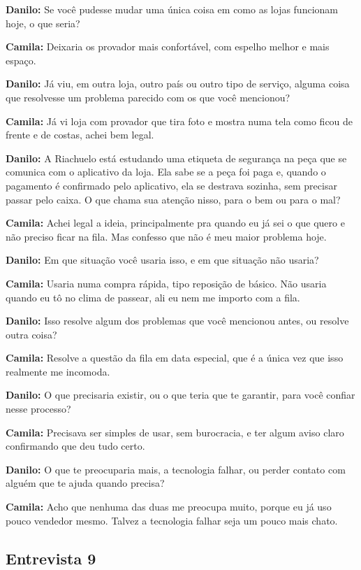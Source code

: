 \textbf{Danilo:} Se você pudesse mudar uma única coisa em como as lojas funcionam hoje, o que seria?

\textbf{Camila:} Deixaria os provador mais confortável, com espelho melhor e mais espaço.

\textbf{Danilo:} Já viu, em outra loja, outro país ou outro tipo de serviço, alguma coisa que resolvesse um problema parecido com os que você mencionou?

\textbf{Camila:} Já vi loja com provador que tira foto e mostra numa tela como ficou de frente e de costas, achei bem legal.

\textbf{Danilo:} A Riachuelo está estudando uma etiqueta de segurança na peça que se comunica com o aplicativo da loja. Ela sabe se a peça foi paga e, quando o pagamento é confirmado pelo aplicativo, ela se destrava sozinha, sem precisar passar pelo caixa. O que chama sua atenção nisso, para o bem ou para o mal?

\textbf{Camila:} Achei legal a ideia, principalmente pra quando eu já sei o que quero e não preciso ficar na fila. Mas confesso que não é meu maior problema hoje.

\textbf{Danilo:} Em que situação você usaria isso, e em que situação não usaria?

\textbf{Camila:} Usaria numa compra rápida, tipo reposição de básico. Não usaria quando eu tô no clima de passear, ali eu nem me importo com a fila.

\textbf{Danilo:} Isso resolve algum dos problemas que você mencionou antes, ou resolve outra coisa?

\textbf{Camila:} Resolve a questão da fila em data especial, que é a única vez que isso realmente me incomoda.

\textbf{Danilo:} O que precisaria existir, ou o que teria que te garantir, para você confiar nesse processo?

\textbf{Camila:} Precisava ser simples de usar, sem burocracia, e ter algum aviso claro confirmando que deu tudo certo.

\textbf{Danilo:} O que te preocuparia mais, a tecnologia falhar, ou perder contato com alguém que te ajuda quando precisa?

\textbf{Camila:} Acho que nenhuma das duas me preocupa muito, porque eu já uso pouco vendedor mesmo. Talvez a tecnologia falhar seja um pouco mais chato.


\subsection*{Entrevista 9}

